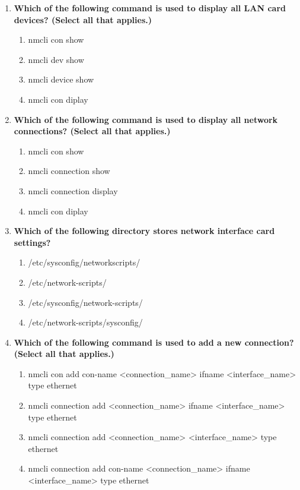 \begin{flushleft}
\begin{enumerate}
		\newpage
		\item \textbf{Which of the following command is used to display all LAN card devices? (Select all that applies.)}
		\begin{enumerate}[label=(\alph*)]
			\item nmcli con show
			\item nmcli dev show %
			\item nmcli device show %
			\item nmcli con diplay
		\end{enumerate}
		\bigskip
		\bigskip		
		
		\item \textbf{Which of the following command is used to display all network connections? (Select all that applies.)}
		\begin{enumerate}[label=(\alph*)]
			\item nmcli con show  %
			\item nmcli connection show %
			\item nmcli connection display %
			\item nmcli con diplay
		\end{enumerate}
		\bigskip
		\bigskip		

		\item \textbf{Which of the following directory stores network interface card settings?}
		\begin{enumerate}[label=(\alph*)]
			\item /etc/sysconfig/networkscripts/
			\item /etc/network-scripts/
			\item /etc/sysconfig/network-scripts/  %
			\item /etc/network-scripts/sysconfig/
		\end{enumerate}
		\bigskip
		\bigskip	

		\item \textbf{Which of the following command is used to add a new connection? (Select all that applies.)}
		\begin{enumerate}[label=(\alph*)]
			\item nmcli con add con-name <connection\_name> ifname <interface\_name> type ethernet  %
			\item nmcli connection add <connection\_name> ifname <interface\_name> type ethernet    
			\item nmcli connection add <connection\_name> <interface\_name> type ethernet  
			\item nmcli connection add con-name <connection\_name> ifname <interface\_name> type ethernet    %
		\end{enumerate}
		\bigskip
		\bigskip	
		

\end{enumerate}
\end{flushleft}
